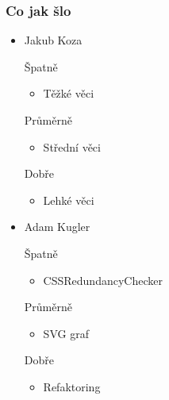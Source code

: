 \documentclass{beamer}
\begin{document}
\begin{frame}[allowframebreaks]\frametitle{Co jak šlo}
  \begin{itemize}
    \item Jakub Koza
     \begin{block}{Špatně} %
       \begin{itemize}
        \item Těžké věci
       \end{itemize}
     \end{block}
     \begin{block}{Průměrně} %
        \begin{itemize}
        \item Střední věci
       \end{itemize}
     \end{block}
     \begin{block}{Dobře} %
       \begin{itemize}
        \item Lehké věci
       \end{itemize}
     \end{block}
   
    \item Adam Kugler
      \begin{block}{Špatně} %
       \begin{itemize}
        \item CSSRedundancyChecker
       \end{itemize}
     \end{block}
     \begin{block}{Průměrně} %
        \begin{itemize}
         \item SVG graf
       \end{itemize}
     \end{block}
     \begin{block}{Dobře} %
       \begin{itemize}
        \item Refaktoring
       \end{itemize}
     \end{block}
  

\end{itemize}
\end{frame}
\end{document}
